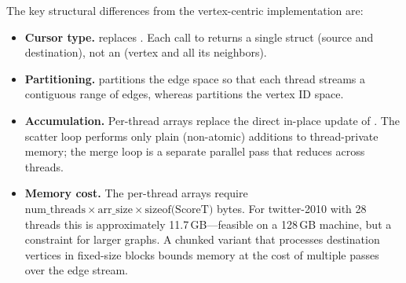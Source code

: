 The key structural differences from the vertex-centric implementation are:
\begin{itemize}
  \item \textbf{Cursor type.}  replaces .  Each call to  returns a single  struct (source and destination), not an  (vertex and all its neighbors).
  \item \textbf{Partitioning.}  partitions the edge space so that each thread streams a contiguous range of edges, whereas  partitions the vertex ID space.
  \item \textbf{Accumulation.} Per-thread  arrays replace the direct in-place update of .  The scatter loop performs only plain (non-atomic) additions to thread-private memory; the merge loop is a separate parallel pass that reduces across threads.
  \item \textbf{Memory cost.} The per-thread arrays require $\text{num\_threads} \times \text{arr\_size} \times \text{sizeof(ScoreT)}$ bytes.  For twitter-2010 with 28 threads this is approximately 11.7\,GB---feasible on a 128\,GB machine, but a constraint for larger graphs.  A chunked variant that processes destination vertices in fixed-size blocks bounds memory at the cost of multiple passes over the edge stream.
\end{itemize}
